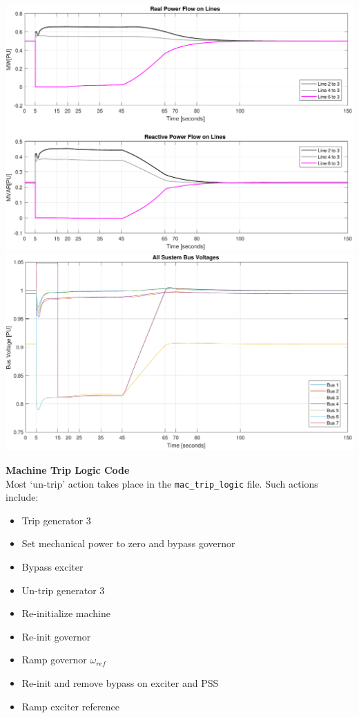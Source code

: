 \pagebreak
\includegraphics[width=\linewidth]{examples/untrip/combinedLoadFlow}
\includegraphics[width=\linewidth]{examples/untrip/combinedBusV}


\pagebreak
\textbf{Machine Trip Logic Code} \ \\
Most `un-trip' action takes place in the \verb|mac_trip_logic| file.
Such actions include:
\begin{itemize}
\item Trip generator 3
\item Set mechanical power to zero and bypass governor
\item Bypass exciter
\item Un-trip generator 3
\item Re-initialize machine
\item Re-init governor
\item Ramp governor $\omega_{ref}$
\item Re-init and remove bypass on exciter and PSS
\item Ramp exciter reference
\end{itemize} 

